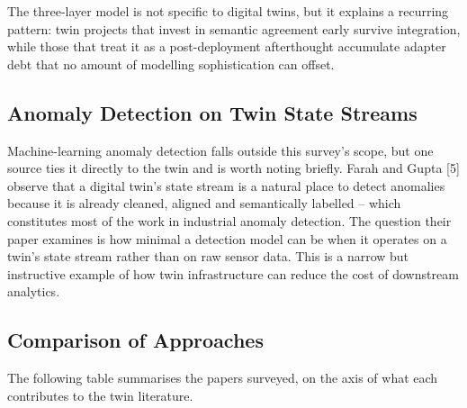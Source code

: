 \documentclass[
  12pt,
  a4paper,
]{article}
\begin{document}
The three-layer model is not specific to digital twins, but it explains
a recurring pattern: twin projects that invest in semantic agreement
early survive integration, while those that treat it as a
post-deployment afterthought accumulate adapter debt that no amount of
modelling sophistication can offset.

\hypertarget{anomaly-detection-on-twin-state-streams}{%
\subsection{Anomaly Detection on Twin State
Streams}\label{anomaly-detection-on-twin-state-streams}}

Machine-learning anomaly detection falls outside this survey's scope,
but one source ties it directly to the twin and is worth noting briefly.
Farah and Gupta {[}5{]} observe that a digital twin's state stream is a
natural place to detect anomalies because it is already cleaned, aligned
and semantically labelled -- which constitutes most of the work in
industrial anomaly detection. The question their paper examines is how
minimal a detection model can be when it operates on a twin's state
stream rather than on raw sensor data. This is a narrow but instructive
example of how twin infrastructure can reduce the cost of downstream
analytics.

\hypertarget{comparison-of-approaches}{%
\subsection{Comparison of Approaches}\label{comparison-of-approaches}}

The following table summarises the papers surveyed, on the axis of what
each contributes to the twin literature.
\end{document}
